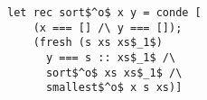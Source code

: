 \begin{figure}[h]
  \centering
  \begin{minipage}{0.87\columnwidth}
    \begin{lstlisting}[frame=tb]
 let rec sort$^o$ x y = conde [
    (x === [] /\ y === []);
    (fresh (s xs xs$_1$)
      y === s :: xs$_1$ /\
      sort$^o$ xs xs$_1$ /\
      smallest$^o$ x s xs)]
    \end{lstlisting}
  \end{minipage}
\end{figure}
